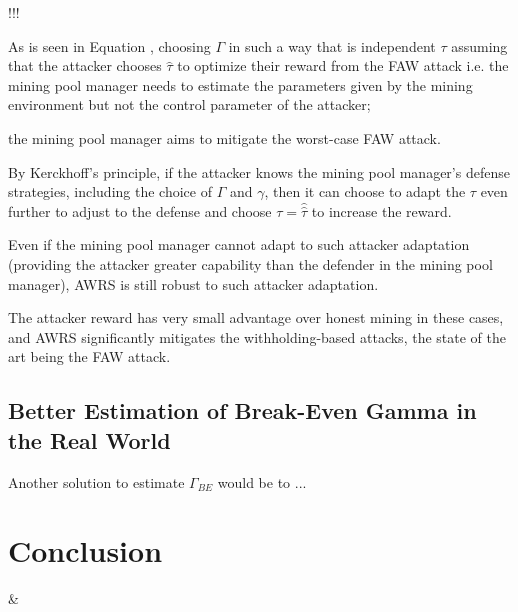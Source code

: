 \documentclass[runningheads]{llncs}
\begin{document}
!!!

As is seen in Equation %
, choosing $\Gamma$ in such a way that is independent  $\tau$ assuming that the attacker chooses $\hat{\tau}$ to optimize their reward from the FAW attack%
i.e. the mining pool manager needs to estimate the parameters given by the mining environment but not the control parameter of the attacker; 

the mining pool manager aims to mitigate the worst-case FAW attack. 


By Kerckhoff's principle, if the attacker knows the mining pool manager's defense strategies, including the choice of $\Gamma$ and $\gamma$, then it can choose to adapt the $\tau$ even further to adjust to the defense and choose $\tau = \hat{\hat{\tau}}$ to increase the reward. 

Even if the mining pool manager cannot adapt to such attacker adaptation (providing the attacker greater capability than the defender in the mining pool manager), AWRS is still robust to such attacker adaptation. 








The attacker reward has very small advantage over honest mining in these cases, and AWRS significantly mitigates the withholding-based attacks, the state of the art being the FAW attack. 



\subsection{Better Estimation of Break-Even Gamma in the Real World}
Another solution to estimate $\Gamma_{BE}$ would be to ...



\section{Conclusion}

                \& \\
\end{document}

